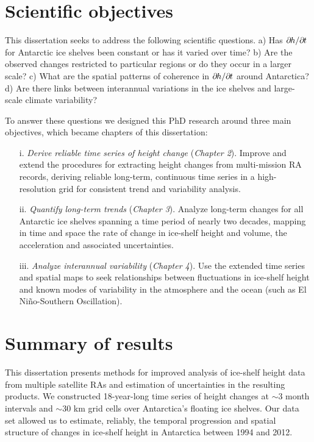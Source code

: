 \section{Scientific objectives}

\noindent
This dissertation seeks to address the following scientific questions.
a) Has $\partial\mkern-1.5mu h / \partial\mkern-1.5mu t$ for Antarctic ice shelves been constant
or has it varied over time?
b) Are the observed changes restricted to particular regions or do they
occur in a larger scale?
c) What are the spatial patterns of coherence in $\partial\mkern-1.5mu h / \partial\mkern-1.5mu t$
around Antarctica?
d) Are there links between interannual variations in the ice shelves and
large-scale climate variability?

To answer these questions we designed this PhD research around three main objectives, which became chapters of this dissertation:

\begin{enumerate}
  \item[i.] {\it Derive reliable time series of height change} ({\sl Chapter 2}). Improve and
  extend the procedures for extracting height changes from multi-mission RA
  records, deriving reliable long-term, continuous time series in a
  high-resolution grid for consistent trend and variability analysis.
  \item[ii.] {\it Quantify long-term trends} ({\sl Chapter 3}). Analyze long-term changes for
  all Antarctic ice shelves spanning a time period of nearly two decades,
  mapping in time and space the rate of change in ice-shelf height and volume, the acceleration
  and associated uncertainties.
  \item[iii.] {\it Analyze interannual variability} ({\sl Chapter 4}). Use the
  extended time series and spatial maps to seek relationships between
  fluctuations in ice-shelf height and known modes of variability in the
  atmosphere and the ocean (such as El Ni\~{n}o-Southern Oscillation).
\end{enumerate}

\clearpage

\section{Summary of results}

\noindent
This dissertation presents methods for improved analysis of ice-shelf height data from multiple satellite RAs and estimation of uncertainties in the resulting products. We constructed 18-year-long time series of height changes at $\sim$3 month intervals and $\sim$30 km grid cells over Antarctica's floating ice shelves. Our data set allowed us to estimate, reliably, the temporal progression and spatial structure of changes in ice-shelf height in Antarctica between 1994 and 2012.

